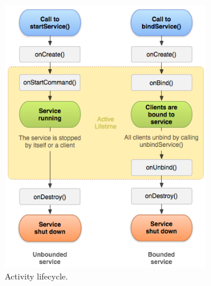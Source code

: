 \begin{figure}[H]
\centering
\includegraphics[width=0.8\textwidth]{Figures/service_lifecycle.png}
\caption{Activity lifecycle.}
\label{android-service}
\end{figure}
